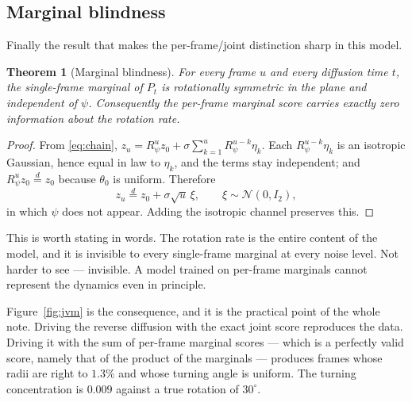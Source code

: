\documentclass[11pt]{article}
\theoremstyle{plain}
\newtheorem{theorem}{Theorem}
\theoremstyle{remark}
\newcommand{\N}{\mathcal{N}}
\begin{document}
\subsection{Marginal blindness}

Finally the result that makes the per-frame/joint distinction sharp in this
model.

\begin{theorem}[Marginal blindness]\label{thm:blind}
For every frame $u$ and every diffusion time $t$, the single-frame marginal of
$P_t$ is rotationally symmetric in the plane and \emph{independent of $\psi$}.
Consequently the per-frame marginal score carries exactly zero information about
the rotation rate.
\end{theorem}

\begin{proof}
From \eqref{eq:chain},
$z_u = R_\psi^u z_0 + \sigma\sum_{k=1}^{u} R_\psi^{u-k}\eta_k$. Each
$R_\psi^{u-k}\eta_k$ is an isotropic Gaussian, hence equal in law to $\eta_k$,
and the terms stay independent; and $R_\psi^u z_0 \stackrel{d}{=} z_0$ because
$\theta_0$ is uniform. Therefore
\begin{equation}
  z_u \stackrel{d}{=} z_0 + \sigma\sqrt{u}\,\xi, \qquad \xi\sim\N(0,I_2),
\end{equation}
in which $\psi$ does not appear. Adding the isotropic channel preserves this.
\end{proof}

This is worth stating in words. The rotation rate is the entire content of the
model, and it is invisible to every single-frame marginal at every noise level.
Not harder to see --- invisible. A model trained on per-frame marginals cannot
represent the dynamics even in principle.

Figure~\ref{fig:jvm} is the consequence, and it is the practical point of the
whole note. Driving the reverse diffusion with the exact joint score reproduces
the data. Driving it with the sum of per-frame marginal scores --- which is a
perfectly valid score, namely that of the product of the marginals --- produces
frames whose radii are right to $1.3\%$ and whose turning angle is uniform. The
turning concentration is $0.009$ against a true rotation of $30^\circ$.
\end{document}
